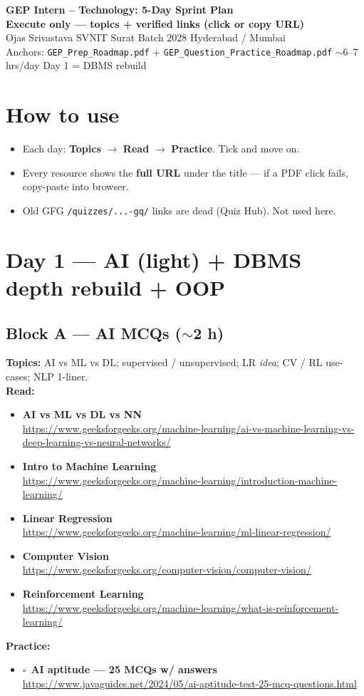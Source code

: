 \documentclass[a4paper,9pt]{extarticle}
\newcommand{\tick}{$\square$\ }
\newcommand{\Res}[2]{\textbf{#1}\\{\footnotesize\url{#2}}}
\begin{document}
\begin{center}
  {\LARGE\textbf{GEP Intern -- Technology: 5-Day Sprint Plan}}\\[0.35pt]
  {\small\color{hot}\textbf{Execute only --- topics + verified links (click or copy URL)}}\\[0.7pt]
  {\small Ojas Srivastava \textbar{} SVNIT Surat \textbar{} Batch 2028 \textbar{} Hyderabad / Mumbai}\\[0.35pt]
  {\footnotesize\color{muted}
  Anchors: \texttt{GEP\_Prep\_Roadmap.pdf} + \texttt{GEP\_Question\_Practice\_Roadmap.pdf}
  \textbar{} $\sim$6--7 hrs/day \textbar{} Day 1 = DBMS rebuild}
\end{center}

\section{How to use}
\begin{itemize}
  \item Each day: \textbf{Topics} $\to$ \textbf{Read} $\to$ \textbf{Practice}. Tick and move on.
  \item Every resource shows the \textbf{full URL} under the title --- if a PDF click fails, copy-paste into browser.
  \item Old GFG \texttt{/quizzes/...-gq/} links are dead (Quiz Hub). Not used here.
\end{itemize}

\section{Day 1 --- AI (light) + DBMS depth rebuild + OOP}
\subsection{Block A --- AI MCQs ($\sim$2 h)}
\noindent\textbf{Topics:} AI vs ML vs DL; supervised / unsupervised; LR \emph{idea}; CV / RL use-cases; NLP 1-liner.\\
\noindent\textbf{Read:}
\begin{itemize}
  \item \Res{AI vs ML vs DL vs NN}{https://www.geeksforgeeks.org/machine-learning/ai-vs-machine-learning-vs-deep-learning-vs-neural-networks/}
  \item \Res{Intro to Machine Learning}{https://www.geeksforgeeks.org/machine-learning/introduction-machine-learning/}
  \item \Res{Linear Regression}{https://www.geeksforgeeks.org/machine-learning/ml-linear-regression/}
  \item \Res{Computer Vision}{https://www.geeksforgeeks.org/computer-vision/computer-vision/}
  \item \Res{Reinforcement Learning}{https://www.geeksforgeeks.org/machine-learning/what-is-reinforcement-learning/}
\end{itemize}
\noindent\textbf{Practice:}
\begin{itemize}
  \item \tick \Res{AI aptitude --- 25 MCQs w/ answers}{https://www.javaguides.net/2024/05/ai-aptitude-test-25-mcq-questions.html}
\end{itemize}
\end{document}
